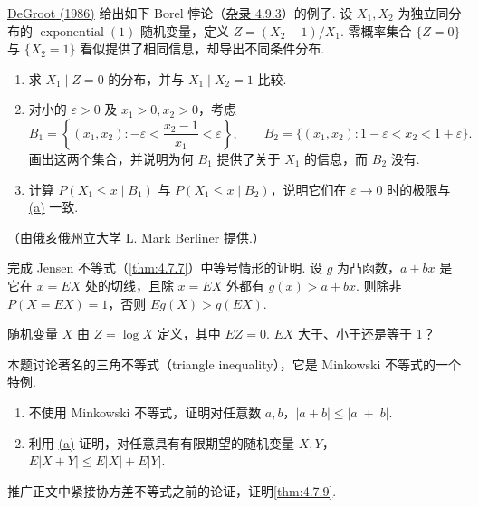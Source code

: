 \begin{exercise}\label{exercise:4.61}
\hyperref[bib:source96]{DeGroot (1986)} 给出如下 Borel 悖论（\hyperref[misc:4.9.3]{杂录 4.9.3}）的例子. 设 $X_1,X_2$ 为独立同分布的 $\operatorname{exponential}(1)$ 随机变量，定义 $Z=(X_2-1)/X_1$. 零概率集合 $\{Z=0\}$ 与 $\{X_2=1\}$ 看似提供了相同信息，却导出不同条件分布.
\begin{enumerate}
\item[(a)]\label{itm:exercise:4.61:a} 求 $X_1\mid Z=0$ 的分布，并与 $X_1\mid X_2=1$ 比较.
\item[(b)] 对小的 $\varepsilon>0$ 及 $x_1>0,x_2>0$，考虑
$$B_1=\left\{(x_1,x_2):-\varepsilon<\frac{x_2-1}{x_1}<\varepsilon\right\},\qquad
B_2=\{(x_1,x_2):1-\varepsilon<x_2<1+\varepsilon\}.$$
画出这两个集合，并说明为何 $B_1$ 提供了关于 $X_1$ 的信息，而 $B_2$ 没有.
\item[(c)] 计算 $P(X_1\le x\mid B_1)$ 与 $P(X_1\le x\mid B_2)$，说明它们在 $\varepsilon\to0$ 时的极限与 \hyperref[itm:exercise:4.61:a]{(a)} 一致.
\end{enumerate}
（由俄亥俄州立大学 L. Mark Berliner 提供.）
\end{exercise}
\begin{exercise}\label{exercise:4.62}
完成 Jensen 不等式（\autoref{thm:4.7.7}）中等号情形的证明. 设 $g$ 为凸函数，$a+bx$ 是它在 $x=EX$ 处的切线，且除 $x=EX$ 外都有 $g(x)>a+bx$. 则除非 $P(X=EX)=1$，否则 $Eg(X)>g(EX)$.
\end{exercise}
\begin{exercise}\label{exercise:4.63}
随机变量 $X$ 由 $Z=\log X$ 定义，其中 $EZ=0$. $EX$ 大于、小于还是等于 1？
\end{exercise}
\begin{exercise}\label{exercise:4.64}
本题讨论著名的三角不等式（triangle inequality），它是 Minkowski 不等式的一个特例.
\begin{enumerate}
\item[(a)]\label{itm:exercise:4.64:a} 不使用 Minkowski 不等式，证明对任意数 $a,b$，$|a+b|\le|a|+|b|$.
\item[(b)] 利用 \hyperref[itm:exercise:4.64:a]{(a)} 证明，对任意具有有限期望的随机变量 $X,Y$，$E|X+Y|\le E|X|+E|Y|$.
\end{enumerate}
\end{exercise}
\begin{exercise}\label{exercise:4.65}
推广正文中紧接协方差不等式之前的论证，证明\autoref{thm:4.7.9}.
\end{exercise}
